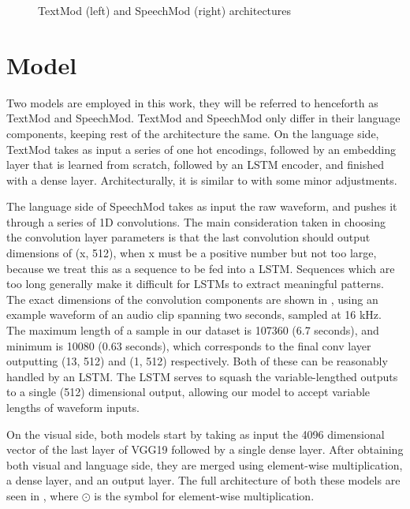 \documentclass[letterpaper]{article} %
\begin{document}
\begin{figure}[t]
\caption{TextMod (left) and SpeechMod (right) architectures}
\label{fig:modarc}
\end{figure}

\section{Model}
\label{sec:method}
Two models are employed in this work, they will be referred to henceforth as TextMod and SpeechMod. TextMod and SpeechMod only differ in their language components, keeping rest of the architecture the same. On the language side, TextMod takes as input a series of one hot encodings, followed by an embedding layer that is learned from scratch, followed by an LSTM encoder, and finished with a dense layer. Architecturally, it is similar to  with some minor adjustments.

The language side of SpeechMod takes as input the raw waveform, and pushes it through a series of 1D convolutions. The main consideration taken in choosing the convolution layer parameters is that the last convolution should output dimensions of (x, 512), when x must be a positive number but not too large, because we treat this as a sequence to be fed into a LSTM. Sequences which are too long generally make it difficult for LSTMs to extract meaningful patterns. The exact dimensions of the convolution components are shown in , using an example waveform of an audio clip spanning two seconds, sampled at 16 kHz. The maximum length of a sample in our dataset is 107360 (6.7 seconds), and minimum is 10080 (0.63 seconds), which corresponds to the final conv layer outputting (13, 512) and (1, 512) respectively. Both of these can be reasonably handled by an LSTM. The LSTM serves to squash the variable-lengthed outputs to a single (512) dimensional output, allowing our model to accept variable lengths of waveform inputs.

On the visual side, both models start by taking as input the 4096 dimensional vector of the last layer of VGG19  followed by a single dense layer. After obtaining both visual and language side, they are merged using element-wise multiplication, a dense layer, and an output layer. The full architecture of both these models are seen in , where $\displaystyle\odot$ is the symbol for element-wise multiplication.
\end{document}
